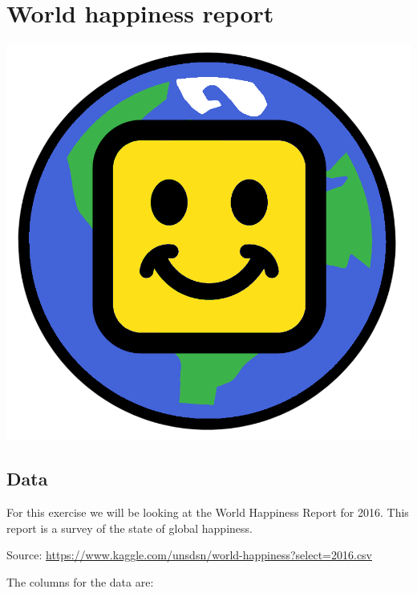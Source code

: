 \documentclass[]{book}
\begin{document}
\section{World happiness report}\label{world-happiness-report}

\begin{center}\includegraphics[width=0.2\linewidth]{figures/world_happiness} \end{center}

\subsection{Data}\label{data}

For this exercise we will be looking at the World Happiness Report for
2016. This report is a survey of the state of global happiness.

Source:
\url{https://www.kaggle.com/unsdsn/world-happiness?select=2016.csv}

The columns for the data are:
\end{document}
